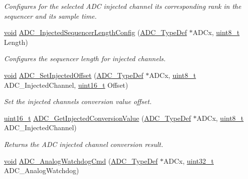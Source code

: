 \begin{DoxyCompactItemize}
\begin{DoxyCompactList}\small\item\em Configures for the selected A\+DC injected channel its corresponding rank in the sequencer and its sample time. \end{DoxyCompactList}\item 
\hyperlink{usb__devapi_8h_afabf60e7f57651d6d595a02c75f07cd0}{void} \hyperlink{group___a_d_c___private___functions_ga24eba90bc3ee955e07659a605011710d}{A\+D\+C\+\_\+\+Injected\+Sequencer\+Length\+Config} (\hyperlink{struct_a_d_c___type_def}{A\+D\+C\+\_\+\+Type\+Def} $\ast$A\+D\+Cx, \hyperlink{_p_e___types_8h_aba7bc1797add20fe3efdf37ced1182c5}{uint8\+\_\+t} Length)
\begin{DoxyCompactList}\small\item\em Configures the sequencer length for injected channels. \end{DoxyCompactList}\item 
\hyperlink{usb__devapi_8h_afabf60e7f57651d6d595a02c75f07cd0}{void} \hyperlink{group___a_d_c___private___functions_ga07a942613088ab3ecfc3d97a20475920}{A\+D\+C\+\_\+\+Set\+Injected\+Offset} (\hyperlink{struct_a_d_c___type_def}{A\+D\+C\+\_\+\+Type\+Def} $\ast$A\+D\+Cx, \hyperlink{_p_e___types_8h_aba7bc1797add20fe3efdf37ced1182c5}{uint8\+\_\+t} A\+D\+C\+\_\+\+Injected\+Channel, \hyperlink{_p_e___types_8h_a1f1825b69244eb3ad2c7165ddc99c956}{uint16\+\_\+t} Offset)
\begin{DoxyCompactList}\small\item\em Set the injected channels conversion value offset. \end{DoxyCompactList}\item 
\hyperlink{_p_e___types_8h_a1f1825b69244eb3ad2c7165ddc99c956}{uint16\+\_\+t} \hyperlink{group___a_d_c___private___functions_ga1dea5ed24571a2e0ce4cbd41c9c1ec46}{A\+D\+C\+\_\+\+Get\+Injected\+Conversion\+Value} (\hyperlink{struct_a_d_c___type_def}{A\+D\+C\+\_\+\+Type\+Def} $\ast$A\+D\+Cx, \hyperlink{_p_e___types_8h_aba7bc1797add20fe3efdf37ced1182c5}{uint8\+\_\+t} A\+D\+C\+\_\+\+Injected\+Channel)
\begin{DoxyCompactList}\small\item\em Returns the A\+DC injected channel conversion result. \end{DoxyCompactList}\item 
\hyperlink{usb__devapi_8h_afabf60e7f57651d6d595a02c75f07cd0}{void} \hyperlink{group___a_d_c___private___functions_gad017d69bec6e497afd35ba25ea22d86e}{A\+D\+C\+\_\+\+Analog\+Watchdog\+Cmd} (\hyperlink{struct_a_d_c___type_def}{A\+D\+C\+\_\+\+Type\+Def} $\ast$A\+D\+Cx, \hyperlink{_p_e___types_8h_a33594304e786b158f3fb30289278f5af}{uint32\+\_\+t} A\+D\+C\+\_\+\+Analog\+Watchdog)

\end{DoxyCompactItemize}
